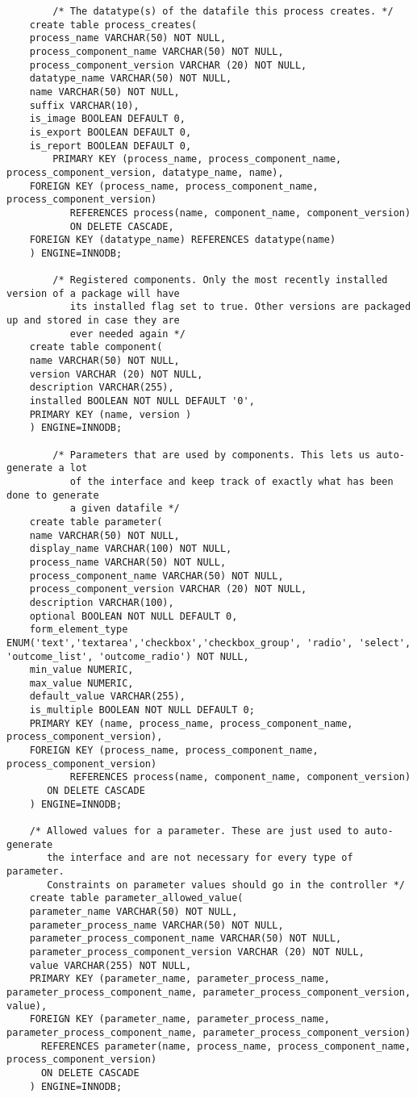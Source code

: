 \begin{tiny}
\begin{verbatim}
        /* The datatype(s) of the datafile this process creates. */
 	create table process_creates(
 	process_name VARCHAR(50) NOT NULL,
	process_component_name VARCHAR(50) NOT NULL,
	process_component_version VARCHAR (20) NOT NULL,
 	datatype_name VARCHAR(50) NOT NULL,
	name VARCHAR(50) NOT NULL,
	suffix VARCHAR(10),
	is_image BOOLEAN DEFAULT 0,
	is_export BOOLEAN DEFAULT 0,
	is_report BOOLEAN DEFAULT 0,
        PRIMARY KEY (process_name, process_component_name, process_component_version, datatype_name, name),
	FOREIGN KEY (process_name, process_component_name, process_component_version) 
           REFERENCES process(name, component_name, component_version) 
           ON DELETE CASCADE,
 	FOREIGN KEY (datatype_name) REFERENCES datatype(name)
 	) ENGINE=INNODB;

        /* Registered components. Only the most recently installed version of a package will have
           its installed flag set to true. Other versions are packaged up and stored in case they are
           ever needed again */
 	create table component(
 	name VARCHAR(50) NOT NULL,
	version VARCHAR (20) NOT NULL,
	description VARCHAR(255),
	installed BOOLEAN NOT NULL DEFAULT '0',
	PRIMARY KEY (name, version )
 	) ENGINE=INNODB;

        /* Parameters that are used by components. This lets us auto-generate a lot
           of the interface and keep track of exactly what has been done to generate
           a given datafile */
 	create table parameter(
 	name VARCHAR(50) NOT NULL,
	display_name VARCHAR(100) NOT NULL,
	process_name VARCHAR(50) NOT NULL,
	process_component_name VARCHAR(50) NOT NULL,
	process_component_version VARCHAR (20) NOT NULL,
 	description VARCHAR(100),
	optional BOOLEAN NOT NULL DEFAULT 0,
	form_element_type ENUM('text','textarea','checkbox','checkbox_group', 'radio', 'select', 'outcome_list', 'outcome_radio') NOT NULL,
	min_value NUMERIC,
	max_value NUMERIC,
	default_value VARCHAR(255),
	is_multiple BOOLEAN NOT NULL DEFAULT 0;
	PRIMARY KEY (name, process_name, process_component_name, process_component_version),
	FOREIGN KEY (process_name, process_component_name, process_component_version) 
           REFERENCES process(name, component_name, component_version) 
	   ON DELETE CASCADE
 	) ENGINE=INNODB;

	/* Allowed values for a parameter. These are just used to auto-generate
	   the interface and are not necessary for every type of parameter. 
	   Constraints on parameter values should go in the controller */
	create table parameter_allowed_value(
 	parameter_name VARCHAR(50) NOT NULL,
	parameter_process_name VARCHAR(50) NOT NULL,
	parameter_process_component_name VARCHAR(50) NOT NULL,
	parameter_process_component_version VARCHAR (20) NOT NULL,
	value VARCHAR(255) NOT NULL,
	PRIMARY KEY (parameter_name, parameter_process_name, parameter_process_component_name, parameter_process_component_version, value),
	FOREIGN KEY (parameter_name, parameter_process_name, parameter_process_component_name, parameter_process_component_version)
	  REFERENCES parameter(name, process_name, process_component_name, process_component_version)
	  ON DELETE CASCADE
	) ENGINE=INNODB;



\end{verbatim}
\end{tiny}

